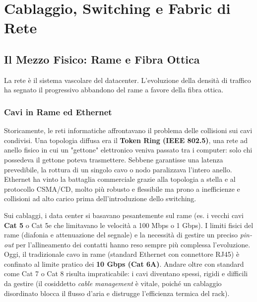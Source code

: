 \chapter{Cablaggio, Switching e Fabric di Rete}

\section{Il Mezzo Fisico: Rame e Fibra Ottica}
La rete è il sistema vascolare del datacenter. L'evoluzione della densità di traffico ha segnato il progressivo abbandono del rame a favore della fibra ottica.

\subsection{Cavi in Rame ed Ethernet}
Storicamente, le reti informatiche affrontavano il problema delle collisioni sui cavi condivisi. Una topologia diffusa era il \textbf{Token Ring (IEEE 802.5)}, una rete ad anello fisico in cui un "gettone" elettronico veniva passato tra i computer: solo chi possedeva il gettone poteva trasmettere. Sebbene garantisse una latenza prevedibile, la rottura di un singolo cavo o nodo paralizzava l'intero anello. Ethernet ha vinto la battaglia commerciale grazie alla topologia a stella e al protocollo CSMA/CD, molto più robusto e flessibile ma prono a inefficienze e collisioni ad alto carico prima dell'introduzione dello switching.

Sui cablaggi, i data center si basavano pesantemente sul rame (es. i vecchi cavi \textbf{Cat 5} o Cat 5e che limitavano le velocità a 100 Mbps o 1 Gbps). I limiti fisici del rame (diafonia e attenuazione del segnale) e la necessità di gestire un preciso \textit{pin-out} per l'allineamento dei contatti hanno reso sempre più complessa l'evoluzione. 
Oggi, il tradizionale cavo in rame (standard Ethernet con connettore RJ45) è confinato al limite pratico dei \textbf{10 Gbps (Cat 6A)}. Andare oltre con standard come Cat 7 o Cat 8 risulta impraticabile: i cavi diventano spessi, rigidi e difficili da gestire (il cosiddetto \textit{cable management} è vitale, poiché un cablaggio disordinato blocca il flusso d'aria e distrugge l'efficienza termica del rack).


